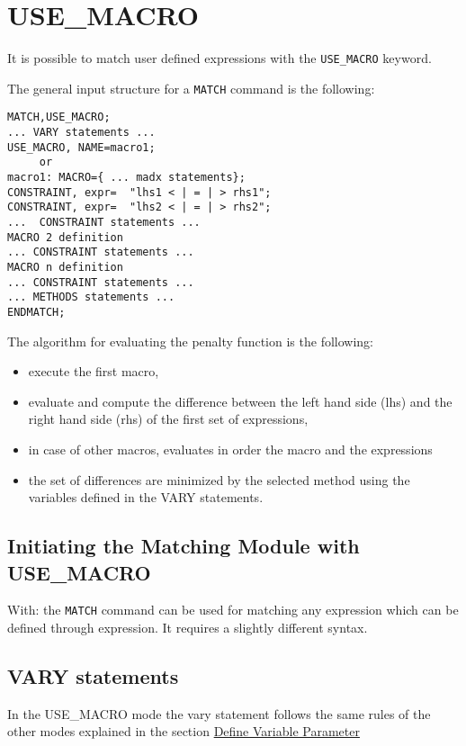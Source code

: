%

\section{USE\_MACRO}
\label{sec:use-macro}
 
It is possible to match user defined expressions with the
{\tt USE\_MACRO} keyword. 

The general input structure for a {\tt MATCH} command is the following:

\begin{verbatim}
MATCH,USE_MACRO;
... VARY statements ...
USE_MACRO, NAME=macro1;
     or
macro1: MACRO={ ... madx statements};
CONSTRAINT, expr=  "lhs1 < | = | > rhs1";
CONSTRAINT, expr=  "lhs2 < | = | > rhs2";
...  CONSTRAINT statements ...
MACRO 2 definition
... CONSTRAINT statements ...
MACRO n definition
... CONSTRAINT statements ...
... METHODS statements ...
ENDMATCH;
\end{verbatim}
 
The algorithm for evaluating the penalty function is the following:
 
\begin{itemize}
   \item  execute the first macro,
   \item  evaluate and compute the difference between the left hand side
     (lhs) and the right hand side (rhs) of the first set of expressions, 
   \item in case of other macros, evaluates in order the macro and the
     expressions 
   \item  the set of differences are  minimized by the selected method
     using the variables defined in the VARY statements. 
\end{itemize}

\subsection{Initiating the Matching Module with USE\_MACRO}
 
With:
the {\tt MATCH} command can be used for matching any expression which can be
defined through expression. It requires a slightly different syntax.

\subsection{VARY statements}
In the USE\_MACRO mode the vary statement follows the same rules of the
other modes explained in the section \href{match_vary.html}{Define
  Variable Parameter} 


